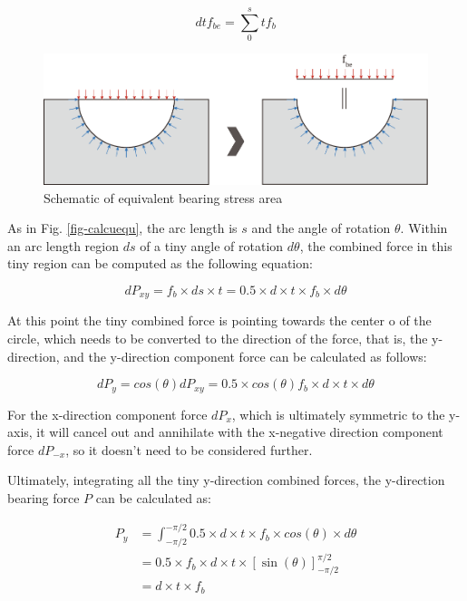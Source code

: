 \begin{equation}
    dtf_{be} = \sum_0^s t f_b
\end{equation}

\begin{figure}[htbp]
    \centering
    \includegraphics[width=0.8\linewidth]{imgs//app/eqvbea.pdf}
    \caption{Schematic of equivalent bearing stress area}
    \label{fig-eqvbea}
\end{figure}


As in Fig. \ref{fig-calcuequ}, the arc length is $s$ and the angle of rotation $\theta$. Within an arc length region $ds$ of a tiny angle of rotation $d\theta$, the combined force in this tiny region can be computed as the following equation:

\begin{equation*}
    dP_{xy}=f_b \times ds \times t = 0.5 \times d \times t \times f_b \times d\theta
\end{equation*}

At this point the tiny combined force is pointing towards the center o of the circle, which needs to be converted to the direction of the force, that is, the y-direction, and the y-direction component force can be calculated as follows:

\begin{equation*}
    dP_y= cos(\theta) dP_{xy} = 0.5 \times cos(\theta) f_b \times d \times t \times d\theta
\end{equation*}

For the x-direction component force $dP_x$, which is ultimately symmetric to the y-axis, it will cancel out and annihilate with the x-negative direction component force $dP_{-x}$, so it doesn't need to be considered further.

Ultimately, integrating all the tiny y-direction combined forces, the y-direction bearing force $P$ can be calculated as:

\begin{align*}
    P_y &= \int_{-\pi / 2}^{-\pi / 2} 0.5 \times d \times t \times f_b \times cos(\theta) \times d\theta \\
    &=0.5 \times f_b \times d \times t \times[\sin (\theta)]_{-\pi / 2}^{\pi / 2} \\
    &= d \times t \times f_b
\end{align*}

